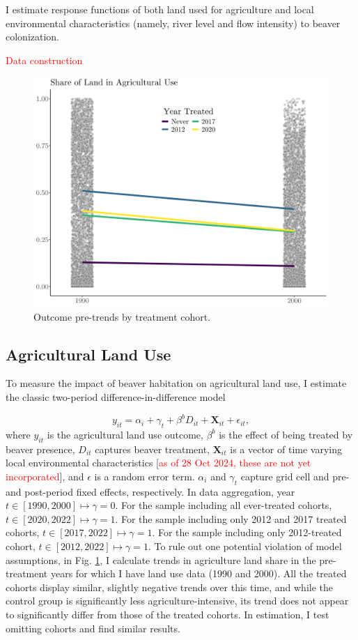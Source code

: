 I estimate response functions of both land used for agriculture and local environmental characteristics (namely, river level and flow intensity) to beaver colonization.

\textcolor{red}{Data construction}

\begin{figure}
    \centering
    \includegraphics[width=0.7\linewidth]{output/figures/outcome_pretrends.png}
    \caption{Outcome pre-trends by treatment cohort.}
    \label{fig:outcome-pretrends}
\end{figure}

\subsection{Agricultural Land Use}

To measure the impact of beaver habitation on agricultural land use, I estimate the classic two-period difference-in-difference model

\begin{equation} \label{eq:main_beaver_eq}
y_{it} = \alpha_i + \gamma_t + \beta^{b}D_{it} + \mathbf{X}_{it} + \epsilon_{it},
\end{equation}
where $y_{it}$ is the agricultural land use outcome, $\beta^b$ is the effect of being treated by beaver presence, $D_{it}$ captures beaver treatment, $\mathbf{X}_{it}$ is a vector of time varying local environmental characteristics [\textcolor{red}{as of 28 Oct 2024, these are not yet incorporated}], and $\epsilon$ is a random error term. $\alpha_i$ and $\gamma_t$ capture grid cell and pre-and post-period fixed effects, respectively. In data aggregation, year $t \in [1990, 2000] \mapsto \gamma = 0$. For the sample including all ever-treated cohorts, $t \in [2020, 2022] \mapsto \gamma = 1$. For the sample including only 2012 and 2017 treated cohorts, $t \in [2017, 2022] \mapsto \gamma = 1$. For the sample including only 2012-treated cohort, $t \in [2012, 2022] \mapsto \gamma = 1$. To rule out one potential violation of model assumptions, in Fig. \ref{fig:outcome-pretrends}, I calculate trends in agriculture land share in the pre-treatment years for which I have land use data (1990 and 2000). All the treated cohorts display similar, slightly negative trends over this time, and while the control group is significantly less agriculture-intensive, its trend does not appear to significantly differ from those of the treated cohorts. In estimation, I test omitting cohorts and find similar results.